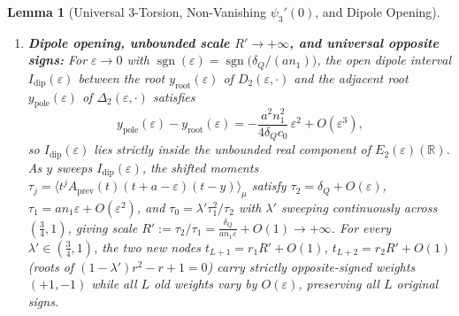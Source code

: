 \documentclass[11pt,a4paper]{article}
\newtheorem{lemma}[theorem]{Lemma}
\theoremstyle{definition}
\theoremstyle{remark}
\newcommand{\RR}{\mathbb{R}}
\begin{document}
\begin{lemma}[Universal $3$-Torsion, Non-Vanishing $\psi_3'(0)$, and Dipole Opening]
\begin{enumerate}
\item[(3)] \textbf{Dipole opening, unbounded scale $R' \to +\infty$, and universal opposite signs:} For $\varepsilon \to 0$ with $\operatorname{sgn}(\varepsilon) = \operatorname{sgn}\!\big(\delta_Q / (a n_1)\big)$, the open dipole interval $I_{\mathrm{dip}}(\varepsilon)$ between the root $y_{\mathrm{root}}(\varepsilon)$ of $D_2(\varepsilon, \cdot)$ and the adjacent root $y_{\mathrm{pole}}(\varepsilon)$ of $\Delta_2(\varepsilon, \cdot)$ satisfies
\[
y_{\mathrm{pole}}(\varepsilon) - y_{\mathrm{root}}(\varepsilon) = -\frac{a^2 n_1^2}{4 \delta_Q c_0}\, \varepsilon^2 + O(\varepsilon^3),
\]
so $I_{\mathrm{dip}}(\varepsilon)$ lies strictly inside the unbounded real component of $E_2(\varepsilon)(\RR)$. As $y$ sweeps $I_{\mathrm{dip}}(\varepsilon)$, the shifted moments $\tau_j = \langle t^j A_{\mathrm{prev}}(t)(t + a - \varepsilon)(t - y) \rangle_\mu$ satisfy $\tau_2 = \delta_Q + O(\varepsilon)$, $\tau_1 = a n_1 \varepsilon + O(\varepsilon^2)$, and $\tau_0 = \lambda' \tau_1^2 / \tau_2$ with $\lambda'$ sweeping continuously across $(\frac{3}{4}, 1)$, giving scale $R' := \tau_2 / \tau_1 = \frac{\delta_Q}{a n_1 \varepsilon} + O(1) \to +\infty$. For every $\lambda' \in (\frac{3}{4}, 1)$, the two new nodes $t_{L+1} = r_1 R' + O(1)$, $t_{L+2} = r_2 R' + O(1)$ (roots of $(1 - \lambda')r^2 - r + 1 = 0$) carry strictly opposite-signed weights $(+1, -1)$ while all $L$ old weights vary by $O(\varepsilon)$, preserving all $L$ original signs.
\end{enumerate}
\end{lemma}
\end{document}
